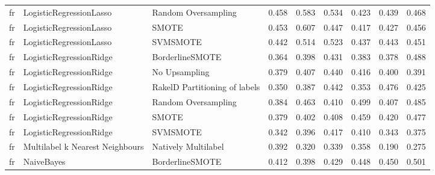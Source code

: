 \begin{tabular}{lllllllll}
      fr &         LogisticRegressionLasso &           Random Oversampling & 0.458 &                     0.583 &                 0.534 &                  0.423 &                                   0.439 &     0.468 \\
      fr &         LogisticRegressionLasso &                         SMOTE & 0.453 &                     0.607 &                 0.447 &                  0.417 &                                   0.427 &     0.456 \\
      fr &         LogisticRegressionLasso &                      SVMSMOTE & 0.442 &                     0.514 &                 0.523 &                  0.437 &                                   0.443 &     0.451 \\
      fr &         LogisticRegressionRidge &               BorderlineSMOTE & 0.364 &                     0.398 &                 0.431 &                  0.383 &                                   0.378 &     0.488 \\
      fr &         LogisticRegressionRidge &                 No Upsampling & 0.379 &                     0.407 &                 0.440 &                  0.416 &                                   0.400 &     0.391 \\
      fr &         LogisticRegressionRidge & RakelD Partitioning of labels & 0.350 &                     0.387 &                 0.442 &                  0.353 &                                   0.476 &     0.425 \\
      fr &         LogisticRegressionRidge &           Random Oversampling & 0.384 &                     0.463 &                 0.410 &                  0.499 &                                   0.407 &     0.485 \\
      fr &         LogisticRegressionRidge &                         SMOTE & 0.379 &                     0.402 &                 0.408 &                  0.459 &                                   0.420 &     0.477 \\
      fr &         LogisticRegressionRidge &                      SVMSMOTE & 0.342 &                     0.396 &                 0.417 &                  0.410 &                                   0.343 &     0.375 \\
      fr & Multilabel k Nearest Neighbours &           Natively Multilabel & 0.392 &                     0.320 &                 0.339 &                  0.358 &                                   0.190 &     0.275 \\
      fr &                      NaiveBayes &               BorderlineSMOTE & 0.412 &                     0.398 &                 0.429 &                  0.448 &                                   0.450 &     0.501 \\

\end{tabular}

